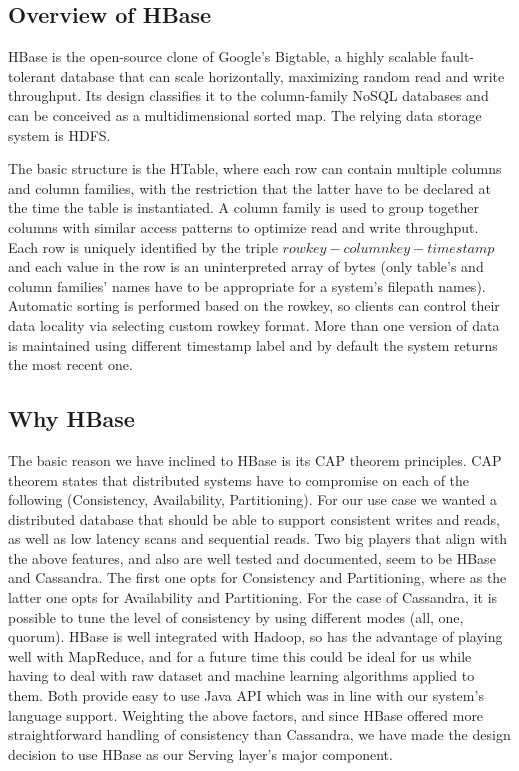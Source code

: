 \documentclass{lmproj}
\begin{document}
\subsection{Overview of HBase}
HBase is the open-source clone of Google's Bigtable, a highly scalable fault-tolerant database that can scale horizontally, maximizing random read and write throughput. Its design classifies it to the column-family NoSQL databases and can be conceived as a multidimensional sorted map. The relying data storage system is HDFS.

The basic structure is the HTable, where each row can contain multiple columns and column families, with the restriction that the latter have to be declared at the time the table is instantiated. A column family is used to group together columns with similar access patterns to optimize read and write throughput. Each row is uniquely identified by the triple $row key-column key-timestamp$ and each value in the row is an uninterpreted array of bytes (only table's and column families' names have to be appropriate for a system's filepath names). Automatic sorting is performed based on the rowkey, so clients can control their data locality via selecting custom rowkey format. More than one version of data is maintained using different timestamp label and by default the system returns the most recent one.

\subsection{Why HBase}

The basic reason we have inclined to HBase is its CAP theorem principles. CAP theorem states that distributed systems have to compromise on each of the following (Consistency, Availability, Partitioning). For our use case we wanted a distributed database that should be able to support consistent writes and reads, as well as low latency scans and sequential reads. Two big players that align with the above features, and also are well tested and documented, seem to be HBase and Cassandra. The first one opts for Consistency and Partitioning, where as the latter one opts for Availability and Partitioning. For the case of Cassandra, it is possible to tune the level of consistency by using different modes (all, one, quorum). HBase is well integrated with Hadoop, so has the advantage of playing well with MapReduce, and for a future time this could be ideal for us while having to deal with raw dataset and machine learning algorithms applied to them. Both provide easy to use Java API which was in line with our system's language support. Weighting the above factors, and since HBase offered more straightforward handling of consistency than Cassandra, we have made the design decision to use HBase as our Serving layer's major component. 
\end{document}
